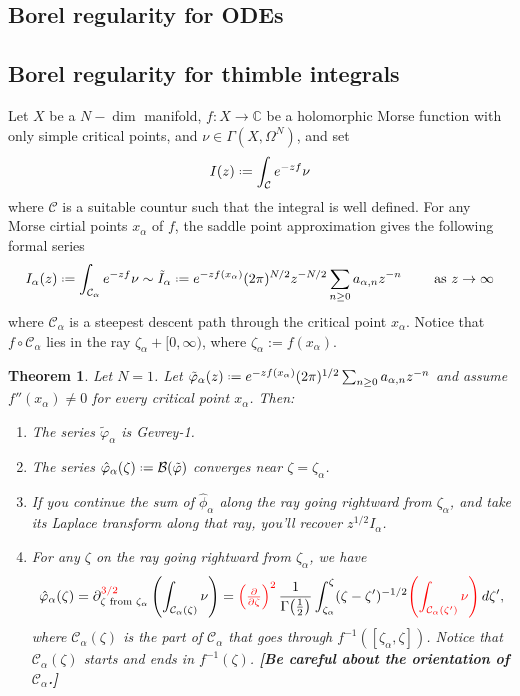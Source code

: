 \documentclass{article}
\newcommand{\C}{\mathbb{C}}
\newcommand*{\defeq}{\mathrel{\vcenter{\baselineskip0.5ex \lineskiplimit0pt
                     \hbox{\scriptsize.}\hbox{\scriptsize.}}}%
                     =}
\newtheorem{theorem}[definition]{Theorem}
\begin{document}
\subsection{Borel regularity for ODEs}
\subsection{Borel regularity for thimble integrals}


Let $X$ be a $N-\dim$ manifold, $f\colon X\to\C$ be a holomorphic Morse function with only simple critical points, and $\nu\in\Gamma(X,\Omega^N)$, and set
\begin{equation}\label{exp-int}
I(z)\defeq\int_{\mathcal{C}}e^{-zf}\nu
\end{equation}
where $\mathcal{C}$ is a suitable countur such that the integral is well defined.  
For any Morse cirtial points $x_\alpha$ of $f$, the saddle point approximation gives the following formal series 
\begin{equation}
I_{\alpha}(z)\defeq\int_{\mathcal{C}_\alpha}e^{-zf}\nu\sim \tilde{I}_{\alpha}\defeq e^{-zf(x_\alpha)}(2\pi)^{N/2} z^{-N/2}\sum_{n\geq 0}a_{\alpha,n}z^{-n} \qquad \text{ as } z\to\infty
\end{equation}
where $\mathcal{C}_\alpha$ is a steepest descent path through the critical point $x_\alpha$. Notice that $f \circ \mathcal{C}_\alpha$ lies in the ray $\zeta_\alpha +[0, \infty)$, where $\zeta_\alpha := f(x_\alpha)$.
\begin{theorem}\label{thm:maxim} Let $N=1$. Let $\tilde{\varphi}_{\alpha}(z)\defeq e^{-zf(x_\alpha)}(2\pi)^{1/2} \sum_{n\geq 0}a_{\alpha,n}z^{-n}$ and assume $f''(x_\alpha)\neq 0$ for every critical point $x_\alpha$. Then:
\begin{enumerate}
\item\label{int:series-gevrey} The series $\tilde{\varphi}_\alpha$ is Gevrey-1.
\item\label{int:resum-converges} The series $\hat{\varphi}_\alpha(\zeta)\defeq\mathcal{B}(\tilde{\varphi})$ converges near $\zeta=\zeta_{\alpha}$.
\item\label{int:resum-valid} If you continue the sum of $\hat{\phi}_\alpha$ along the ray going rightward from $\zeta_\alpha$, and take its Laplace transform along that ray, you'll recover $z^{1/2} I_\alpha$.
\item\label{int:deriv-formula} For any $\zeta$ on the ray going rightward from $\zeta_\alpha$, we have
\begin{multline}\label{formula1}
\hat{\varphi}_{\alpha}(\zeta)=\partial^{\textcolor{red}{3/2}}_{\zeta \text{ from }\zeta_\alpha} \left( \int_{\mathcal{C}_\alpha(\zeta)}\nu \right)=\textcolor{red}{\left(\tfrac{\partial}{\partial \zeta}\right)^2}\,\frac{1}{\Gamma\big(\tfrac{1}{2}\big)} \int_{\zeta_\alpha}^\zeta (\zeta-\zeta')^{-1/2} \textcolor{red}{\left( \int_{\mathcal{C}_\alpha(\zeta')} \nu \right)}\,d\zeta',
\end{multline}
where $\mathcal{C}_\alpha(\zeta)$ is the part of $\mathcal{C}_\alpha$ that goes through $f^{-1}([\zeta_\alpha, \zeta])$. Notice that $\mathcal{C}_\alpha(\zeta)$ starts and ends in $f^{-1}(\zeta)$. \textbf{[Be careful about the orientation of $\mathcal{C}_\alpha$.]}
\end{enumerate}
\end{theorem}
\end{document}
